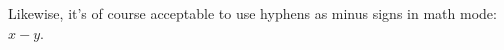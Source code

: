 \documentclass{article}
\begin{document}

Likewise, it's of course acceptable to use hyphens as minus signs in math mode: \(x - y\).
\end{document}
